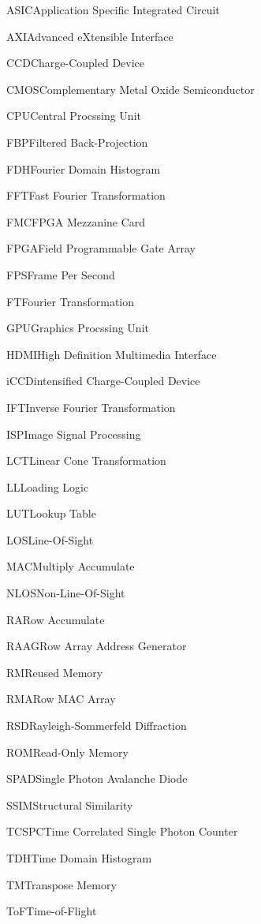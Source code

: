 \documentclass[master]{shtthesis}             %
\begin{document}
\begin{nomenclatures}[缩写]
  \item{ASIC}{Application Specific Integrated Circuit}
  \item{AXI}{Advanced eXtensible Interface}
  \item{CCD}{Charge-Coupled Device}
  \item{CMOS}{Complementary Metal Oxide Semiconductor}
  \item{CPU}{Central Procssing Unit}
  \item{FBP}{Filtered Back-Projection}
  \item{FDH}{Fourier Domain Histogram}
  \item{FFT}{Fast Fourier Transformation}
  \item{FMC}{FPGA Mezzanine Card}
  \item{FPGA}{Field Programmable Gate Array}
  \item{FPS}{Frame Per Second}
  \item{FT}{Fourier Transformation}
  \item{GPU}{Graphics Procssing Unit}
  \item{HDMI}{High Definition Multimedia Interface}
  \item{iCCD}{intensified Charge-Coupled Device}
  \item{IFT}{Inverse Fourier Transformation}
  \item{ISP}{Image Signal Processing}
  \item{LCT}{Linear Cone Transformation}
  \item{LL}{Loading Logic}
  \item{LUT}{Lookup Table}
  \item{LOS}{Line-Of-Sight}
  \item{MAC}{Multiply Accumulate}
  \item{NLOS}{Non-Line-Of-Sight}
  \item{RA}{Row Accumulate}
  \item{RAAG}{Row Array Address Generator}
  \item{RM}{Reused Memory}
  \item{RMA}{Row MAC Array}
  \item{RSD}{Rayleigh-Sommerfeld Diffraction}
  \item{ROM}{Read-Only Memory}
  \item{SPAD}{Single Photon Avalanche Diode}
  \item{SSIM}{Structural Similarity}
  \item{TCSPC}{Time Correlated Single Photon Counter}
  \item{TDH}{Time Domain Histogram}
  \item{TM}{Transpose Memory}
  \item{ToF}{Time-of-Flight}
\end{nomenclatures}
\end{document}
